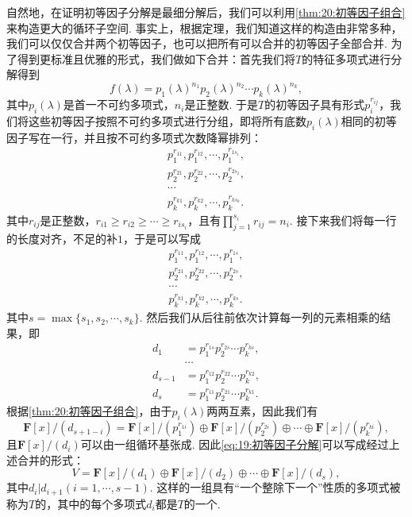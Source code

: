 自然地，在证明初等因子分解是最细分解后，我们可以利用\autoref{thm:20:初等因子组合}来构造更大的循环子空间. 事实上，根据定理，我们知道这样的构造由非常多种，我们可以仅仅合并两个初等因子，也可以把所有可以合并的初等因子全部合并. 为了得到更标准且优雅的形式，我们做如下合并：首先我们将$T$的特征多项式进行分解得到
\[f(\lambda)=p_1(\lambda)^{n_1}p_2(\lambda)^{n_2}\cdots p_k(\lambda)^{n_k},\]
其中$p_i(\lambda)$是首一不可约多项式，$n_i$是正整数. 于是$T$的初等因子具有形式$p_i^{r_{ij}}$，我们将这些初等因子按照不可约多项式进行分组，即将所有底数$p_i(\lambda)$相同的初等因子写在一行，并且按不可约多项式次数降幂排列：
\begin{gather*}
    p_1^{r_{11}},p_1^{r_{12}},\cdots,p_1^{r_{1s_1}}, \\
    p_2^{r_{21}},p_2^{r_{22}},\cdots,p_2^{r_{2s_2}}, \\
    \cdots \\
    p_k^{r_{k1}},p_k^{r_{k2}},\cdots,p_k^{r_{ks_k}}.
\end{gather*}
其中$r_{ij}$是正整数，$r_{i1}\geqslant r_{i2}\geqslant\cdots\geqslant r_{is_i}$，且有$\prod\limits_{j=1}^{s_i}r_{ij}=n_i$. 接下来我们将每一行的长度对齐，不足的补$1$，于是可以写成
\begin{gather*}
    p_1^{r_{11}},p_1^{r_{12}},\cdots,p_1^{r_{1s}}, \\
    p_2^{r_{21}},p_2^{r_{22}},\cdots,p_2^{r_{2s}}, \\
    \cdots \\
    p_k^{r_{k1}},p_k^{r_{k2}},\cdots,p_k^{r_{ks}}.
\end{gather*}
其中$s=\max\{s_1,s_2,\cdots,s_k\}$. 然后我们从后往前依次计算每一列的元素相乘的结果，即
\begin{align*}
    d_1 & =p_1^{r_{1s}}p_2^{r_{2s}}\cdots p_k^{r_{ks}}, \\
    & \cdots \\
    d_{s-1} & =p_1^{r_{12}}p_2^{r_{22}}\cdots p_k^{r_{k2}}, \\
    d_s & =p_1^{r_{11}}p_2^{r_{21}}\cdots p_k^{r_{k1}}.
\end{align*}
根据\autoref{thm:20:初等因子组合}，由于$p_i(\lambda)$两两互素，因此我们有
\[\mathbf{F}[x]/(d_{s+1-i})=\mathbf{F}[x]/(p_1^{r_{1i}})\oplus\mathbf{F}[x]/(p_2^{r_{2i}})\oplus\cdots\oplus\mathbf{F}[x]/(p_k^{r_{ki}}),\]
且$\mathbf{F}[x]/(d_i)$可以由一组循环基张成. 因此\autoref{eq:19:初等因子分解}可以写成经过上述合并的形式：
\begin{equation} \label{eq:20:不变因子分解}
    V=\mathbf{F}[x]/(d_1)\oplus\mathbf{F}[x]/(d_2)\oplus\cdots\oplus\mathbf{F}[x]/(d_s),
\end{equation}
其中$d_i|d_{i+1}(i=1,\cdots,s-1)$. 这样的一组具有``一个整除下一个''性质的多项式被称为$T$的，其中的每个多项式$d_i$都是$T$的一个.

